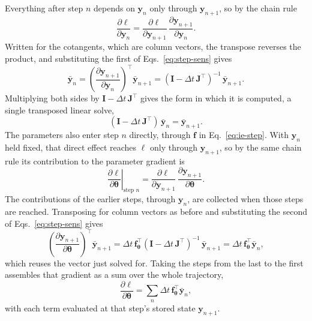 \documentclass{article}
\begin{document}
Everything after step \(n\) depends on \(\mathbf{y}_n\) only through \(\mathbf{y}_{n+1}\), so by the chain rule
\begin{equation}
  \frac{\partial\ell}{\partial\mathbf{y}_n}=\frac{\partial\ell}{\partial\mathbf{y}_{n+1}}\,\frac{\partial\mathbf{y}_{n+1}}{\partial\mathbf{y}_n}.
  \label{eq:chain-step}
\end{equation}
Written for the cotangents, which are column vectors, the transpose reverses the product, and substituting the first of Eqs.~\eqref{eq:step-sens} gives
\begin{equation}
  \bar{\mathbf{y}}_n=\left(\frac{\partial\mathbf{y}_{n+1}}{\partial\mathbf{y}_n}\right)^{\!\top}\bar{\mathbf{y}}_{n+1}=(\mathbf{I}-\Delta t\,\mathbf{J}^{\top})^{-1}\,\bar{\mathbf{y}}_{n+1}.
  \label{eq:cotangent-step}
\end{equation}
Multiplying both sides by \(\mathbf{I}-\Delta t\,\mathbf{J}^{\top}\) gives the form in which it is computed, a single transposed linear solve,
\begin{equation}
  (\mathbf{I}-\Delta t\,\mathbf{J}^{\top})\,\bar{\mathbf{y}}_{n}=\bar{\mathbf{y}}_{n+1}.
  \label{eq:discrete-adjoint}
\end{equation}
The parameters also enter step \(n\) directly, through \(\mathbf{f}\) in Eq.~\eqref{eq:ie-step}. With \(\mathbf{y}_n\) held fixed, that direct effect reaches \(\ell\) only through \(\mathbf{y}_{n+1}\), so by the same chain rule its contribution to the parameter gradient is
\begin{equation}
  \left.\frac{\partial\ell}{\partial\boldsymbol{\theta}}\right|_{\text{step }n}=\frac{\partial\ell}{\partial\mathbf{y}_{n+1}}\,\frac{\partial\mathbf{y}_{n+1}}{\partial\boldsymbol{\theta}}.
  \label{eq:chain-param}
\end{equation}
The contributions of the earlier steps, through \(\mathbf{y}_n\), are collected when those steps are reached. Transposing for column vectors as before and substituting the second of Eqs.~\eqref{eq:step-sens} gives
\begin{equation}
  \left(\frac{\partial\mathbf{y}_{n+1}}{\partial\boldsymbol{\theta}}\right)^{\!\top}\bar{\mathbf{y}}_{n+1}=\Delta t\,\mathbf{f}_{\boldsymbol{\theta}}^{\top}(\mathbf{I}-\Delta t\,\mathbf{J}^{\top})^{-1}\,\bar{\mathbf{y}}_{n+1}=\Delta t\,\mathbf{f}_{\boldsymbol{\theta}}^{\top}\bar{\mathbf{y}}_n,
  \label{eq:param-step}
\end{equation}
which reuses the vector just solved for. Taking the steps from the last to the first assembles that gradient as a sum over the whole trajectory,
\begin{equation}
  \frac{\partial\ell}{\partial\boldsymbol{\theta}}=\sum_{n}\Delta t\,\mathbf{f}_{\boldsymbol{\theta}}^{\top}\bar{\mathbf{y}}_{n},
  \label{eq:adjoint-grad}
\end{equation}
with each term evaluated at that step's stored state \(\mathbf{y}_{n+1}\).
\end{document}
